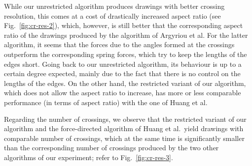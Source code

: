 \documentclass[runningheads]{llncs}
\begin{document}
While our unrestricted algorithm produces drawings with better crossing resolution, this comes at a cost of drastically increased aspect ratio (see Fig.~\ref{fig:cr-res-2}), which, however, is still better that the corresponding aspect ratio of the drawings produced by the algorithm of Argyriou et al. For the latter algorithm, it seems that the forces due to the angles formed at the crossings outperform the corresponding spring forces, which try to keep the lengths of the edges short. Going back to our unrestricted algorithm, its behaviour is up to a certain degree expected, mainly due to the fact that there is no control on the lengths of the edges.
On the other hand, the restricted variant of our algorithm, which does not allow the aspect ratio to increase, has more or less comparable performance (in terms of aspect ratio) with the one of Huang et al.

Regarding the number of crossings, we observe that the restricted variant of our algorithm and the force-directed algorithm of Huang et al.\ yield drawings with comparable number of crossings, which at the same time is significantly smaller than the corresponding number of crossings produced by the two other algorithms of our experiment; refer to Fig.~\ref{fig:cr-res-3}.
\end{document}
